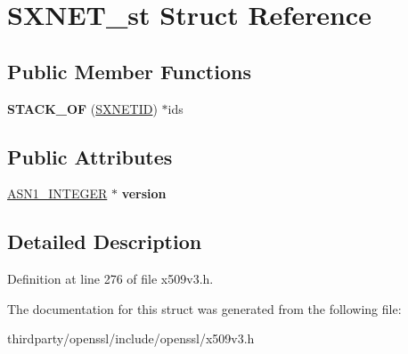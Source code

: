 \hypertarget{struct_s_x_n_e_t__st}{}\section{S\+X\+N\+E\+T\+\_\+st Struct Reference}
\label{struct_s_x_n_e_t__st}
\subsection*{Public Member Functions}
\begin{DoxyCompactItemize}
\item 
\mbox{\label{struct_s_x_n_e_t__st_a1f702e22d6ea6f503c1957c09b9d440f}} 
{\bfseries S\+T\+A\+C\+K\+\_\+\+OF} (\hyperlink{struct_s_x_n_e_t___i_d__st}{S\+X\+N\+E\+T\+ID}) $\ast$ids
\end{DoxyCompactItemize}
\subsection*{Public Attributes}
\begin{DoxyCompactItemize}
\item 
\mbox{\label{struct_s_x_n_e_t__st_ac542b59573e2c64e51f9bdfb49144526}} 
\hyperlink{structasn1__string__st}{A\+S\+N1\+\_\+\+I\+N\+T\+E\+G\+ER} $\ast$ {\bfseries version}
\end{DoxyCompactItemize}


\subsection{Detailed Description}


Definition at line 276 of file x509v3.\+h.



The documentation for this struct was generated from the following file\+:\begin{DoxyCompactItemize}
\item 
thirdparty/openssl/include/openssl/x509v3.\+h\end{DoxyCompactItemize}
